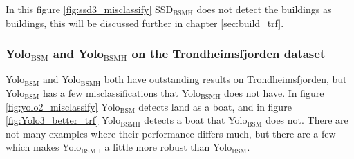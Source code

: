 In this figure \ref{fig:ssd3_misclassify} SSD$_{\text{BSMH}}$ does not detect the buildings as buildings, this will be discussed further in chapter \ref{sec:build_trf}.

\vspace{3mm}

\subsubsection{Yolo$_{\text{BSM}}$ and Yolo$_{\text{BSMH}}$ on the Trondheimsfjorden dataset}

Yolo$_{\text{BSM}}$ and Yolo$_{\text{BSMH}}$ both have outstanding results on Trondheimsfjorden, but Yolo$_{\text{BSM}}$ has a few misclassifications that Yolo$_{\text{BSMH}}$ does not have. In figure \ref{fig:yolo2_misclassify} Yolo$_{\text{BSM}}$ detects land as a boat, and in figure \ref{fig:Yolo3_better_trf} Yolo$_{\text{BSMH}}$ detects a boat that Yolo$_{\text{BSM}}$ does not. There are not many examples where their performance differs much, but there are a few which makes Yolo$_{\text{BSMH}}$ a little more robust than Yolo$_{\text{BSM}}$.


